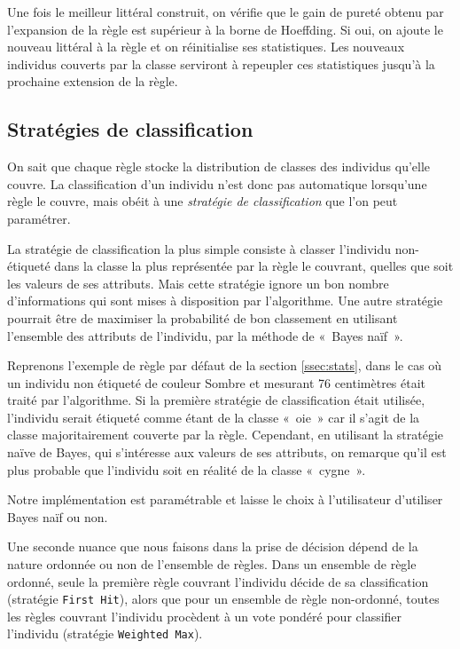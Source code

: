             Une fois le meilleur littéral construit, on vérifie que le gain de pureté obtenu par l'expansion de la règle est supérieur à la borne de Hoeffding. Si oui, on ajoute le nouveau littéral à la règle et on réinitialise ses statistiques. Les nouveaux individus couverts par la classe serviront à repeupler ces statistiques jusqu'à la prochaine extension de la règle.

        
        \subsection{Stratégies de classification}\label{ssec:nondecisional}
        
            On sait que chaque règle stocke la distribution de classes des individus qu'elle couvre. La classification d'un individu n'est donc pas automatique lorsqu'une règle le couvre, mais obéit à une \emph{stratégie de classification} que l'on peut paramétrer.

            La stratégie de classification la plus simple consiste à classer l’individu non-étiqueté dans la classe la plus représentée par la règle le couvrant, quelles que soit les valeurs de ses attributs. Mais cette stratégie ignore un bon nombre d’informations qui sont mises à disposition par l’algorithme. Une autre stratégie pourrait être de maximiser la probabilité de bon classement en utilisant l’ensemble des attributs de l’individu, par la méthode de «~Bayes naïf~».\cite{Gama-VFDR}
            
            Reprenons l’exemple de règle par défaut de la section \ref{ssec:stats}, dans le cas où un individu non étiqueté de couleur Sombre et mesurant 76 centimètres était traité par l’algorithme. Si la première stratégie de classification était utilisée, l’individu serait étiqueté comme étant de la classe «~oie~» car il s'agit de la classe majoritairement couverte par la règle. Cependant, en utilisant la stratégie naïve de Bayes, qui s'intéresse aux valeurs de ses attributs, on remarque qu’il est plus probable que l’individu soit en réalité de la classe «~cygne~». 

            Notre implémentation est paramétrable et laisse le choix à l'utilisateur d'utiliser Bayes naïf ou non.

            Une seconde nuance que nous faisons dans la prise de décision dépend de la nature ordonnée ou non de l'ensemble de règles. Dans un ensemble de règle ordonné, seule la première règle couvrant l’individu décide de sa classification (stratégie \texttt{First Hit}), alors que pour un ensemble de règle non-ordonné, toutes les règles couvrant l’individu procèdent à un vote pondéré pour classifier l’individu (stratégie \texttt{Weighted Max}).





